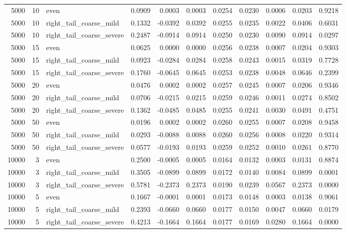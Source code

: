\begin{table}[!h]
{\begin{tabular}[t]{rrlrrrrrrrr}
5000 & 10 & even & 0.0909 & 0.0003 & 0.0003 & 0.0254 & 0.0230 & 0.0006 & 0.0203 & 0.9218\\
5000 & 10 & right\_tail\_coarse\_mild & 0.1332 & -0.0392 & 0.0392 & 0.0255 & 0.0235 & 0.0022 & 0.0406 & 0.6031\\
5000 & 10 & right\_tail\_coarse\_severe & 0.2487 & -0.0914 & 0.0914 & 0.0250 & 0.0230 & 0.0090 & 0.0914 & 0.0297\\
5000 & 15 & even & 0.0625 & 0.0000 & 0.0000 & 0.0256 & 0.0238 & 0.0007 & 0.0204 & 0.9303\\
5000 & 15 & right\_tail\_coarse\_mild & 0.0923 & -0.0284 & 0.0284 & 0.0258 & 0.0243 & 0.0015 & 0.0319 & 0.7728\\
5000 & 15 & right\_tail\_coarse\_severe & 0.1760 & -0.0645 & 0.0645 & 0.0253 & 0.0238 & 0.0048 & 0.0646 & 0.2399\\
5000 & 20 & even & 0.0476 & 0.0002 & 0.0002 & 0.0257 & 0.0245 & 0.0007 & 0.0206 & 0.9346\\
5000 & 20 & right\_tail\_coarse\_mild & 0.0706 & -0.0215 & 0.0215 & 0.0259 & 0.0246 & 0.0011 & 0.0274 & 0.8502\\
5000 & 20 & right\_tail\_coarse\_severe & 0.1362 & -0.0485 & 0.0485 & 0.0255 & 0.0241 & 0.0030 & 0.0491 & 0.4751\\
5000 & 50 & even & 0.0196 & 0.0002 & 0.0002 & 0.0260 & 0.0255 & 0.0007 & 0.0208 & 0.9458\\
5000 & 50 & right\_tail\_coarse\_mild & 0.0293 & -0.0088 & 0.0088 & 0.0260 & 0.0256 & 0.0008 & 0.0220 & 0.9314\\
5000 & 50 & right\_tail\_coarse\_severe & 0.0577 & -0.0193 & 0.0193 & 0.0259 & 0.0252 & 0.0010 & 0.0261 & 0.8770\\
10000 & 3 & even & 0.2500 & -0.0005 & 0.0005 & 0.0164 & 0.0132 & 0.0003 & 0.0131 & 0.8874\\
10000 & 3 & right\_tail\_coarse\_mild & 0.3505 & -0.0899 & 0.0899 & 0.0172 & 0.0140 & 0.0084 & 0.0899 & 0.0001\\
10000 & 3 & right\_tail\_coarse\_severe & 0.5781 & -0.2373 & 0.2373 & 0.0190 & 0.0239 & 0.0567 & 0.2373 & 0.0000\\
10000 & 5 & even & 0.1667 & -0.0001 & 0.0001 & 0.0173 & 0.0148 & 0.0003 & 0.0138 & 0.9061\\
10000 & 5 & right\_tail\_coarse\_mild & 0.2393 & -0.0660 & 0.0660 & 0.0177 & 0.0150 & 0.0047 & 0.0660 & 0.0179\\
10000 & 5 & right\_tail\_coarse\_severe & 0.4213 & -0.1664 & 0.1664 & 0.0177 & 0.0169 & 0.0280 & 0.1664 & 0.0000\\

\end{tabular}}
\end{table}
